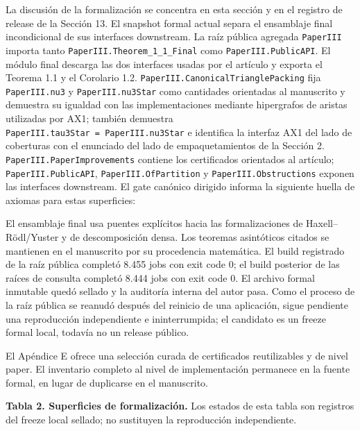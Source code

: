 \documentclass[
  spanish,
  11pt,
  a4paper,
]{article}
\newenvironment{Shaded}{}{}
\newcommand{\NormalTok}[1]{#1}
\begin{document}
La discusión de la formalización se concentra en esta sección y en el registro de release de la Sección 13. El snapshot formal actual separa el ensamblaje final incondicional de sus interfaces downstream. La raíz pública agregada \texttt{PaperIII} importa tanto \texttt{PaperIII.Theorem\_1\_1\_Final} como \texttt{PaperIII.PublicAPI}. El módulo final descarga las dos interfaces usadas por el artículo y exporta el Teorema 1.1 y el Corolario 1.2. \texttt{PaperIII.CanonicalTrianglePacking} fija \texttt{PaperIII.nu3} y \texttt{PaperIII.nu3Star} como cantidades orientadas al manuscrito y demuestra su igualdad con las implementaciones mediante hipergrafos de aristas utilizadas por AX1; también demuestra \texttt{PaperIII.tau3Star\ =\ PaperIII.nu3Star} e identifica la interfaz AX1 del lado de coberturas con el enunciado del lado de empaquetamientos de la Sección 2. \texttt{PaperIII.PaperImprovements} contiene los certificados orientados al artículo; \texttt{PaperIII.PublicAPI}, \texttt{PaperIII.OfPartition} y \texttt{PaperIII.Obstructions} exponen las interfaces downstream. El gate canónico dirigido informa la siguiente huella de axiomas para estas superficies:

\begin{Shaded}
\begin{Highlighting}[]
\NormalTok{[propext, Classical.choice, Quot.sound]}
\end{Highlighting}
\end{Shaded}

El ensamblaje final usa puentes explícitos hacia las formalizaciones de Haxell--Rödl/Yuster y de descomposición densa. Los teoremas asintóticos citados se mantienen en el manuscrito por su procedencia matemática. El build registrado de la raíz pública completó 8.455 jobs con exit code 0; el build posterior de las raíces de consulta completó 8.444 jobs con exit code 0. El archivo formal inmutable quedó sellado y la auditoría interna del autor pasa. Como el proceso de la raíz pública se reanudó después del reinicio de una aplicación, sigue pendiente una reproducción independiente e ininterrumpida; el candidato es un freeze formal local, todavía no un release público.

El Apéndice E ofrece una selección curada de certificados reutilizables y de nivel paper. El inventario completo al nivel de implementación permanece en la fuente formal, en lugar de duplicarse en el manuscrito.

\textbf{Tabla 2. Superficies de formalización.} Los estados de esta tabla son registros del freeze local sellado; no sustituyen la reproducción independiente.
\end{document}
